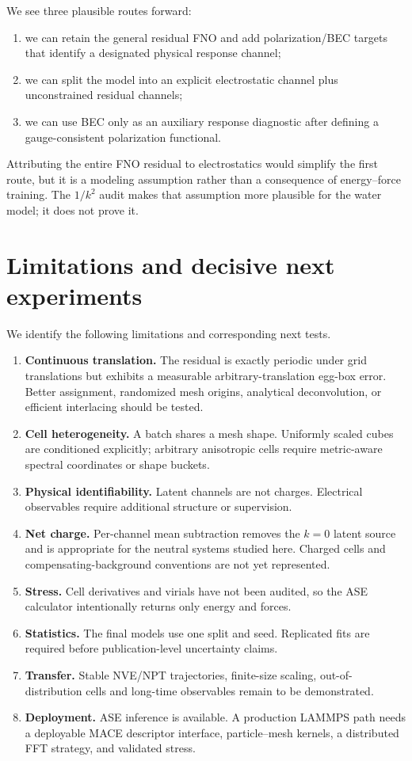 \documentclass[11pt]{article}
\begin{document}
We see three plausible routes forward:
\begin{enumerate}
 \item we can retain the general residual FNO and add polarization/BEC targets that
 identify a designated physical response channel;
 \item we can split the model into an explicit electrostatic channel plus
 unconstrained residual channels;
 \item we can use BEC only as an auxiliary response diagnostic after defining a
 gauge-consistent polarization functional.
\end{enumerate}
Attributing the entire FNO residual to electrostatics would simplify the first
route, but it is a modeling assumption rather than a consequence of
energy--force training. The \(1/k^2\) audit makes that assumption more
plausible for the water model; it does not prove it.

\section{Limitations and decisive next experiments}

We identify the following limitations and corresponding next tests.

\begin{enumerate}
 \item \textbf{Continuous translation.} The residual is exactly periodic
 under grid translations but exhibits a measurable arbitrary-translation
 egg-box error. Better assignment, randomized mesh origins, analytical
 deconvolution, or efficient interlacing should be tested.
 \item \textbf{Cell heterogeneity.} A batch shares a mesh shape. Uniformly
 scaled cubes are conditioned explicitly; arbitrary anisotropic cells require
 metric-aware spectral coordinates or shape buckets.
 \item \textbf{Physical identifiability.} Latent channels are not charges.
 Electrical observables require additional structure or supervision.
 \item \textbf{Net charge.} Per-channel mean subtraction removes the
 \(k=0\) latent source and is appropriate for the neutral systems studied
 here. Charged cells and compensating-background conventions are not yet
 represented.
 \item \textbf{Stress.} Cell derivatives and virials have not been audited,
 so the ASE calculator intentionally returns only energy and forces.
 \item \textbf{Statistics.} The final models use one split and seed.
 Replicated fits are required before publication-level uncertainty claims.
 \item \textbf{Transfer.} Stable NVE/NPT trajectories,
 finite-size scaling, out-of-distribution cells and long-time observables
 remain to be demonstrated.
 \item \textbf{Deployment.} ASE inference is available. A production LAMMPS
 path needs a deployable MACE descriptor interface, particle--mesh kernels,
 a distributed FFT strategy, and validated stress.
\end{enumerate}
\end{document}
